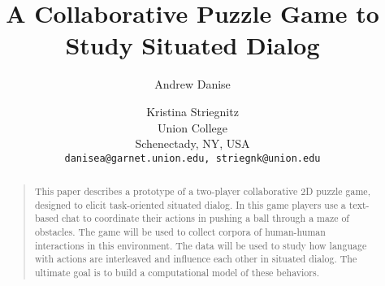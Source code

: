 \documentclass[letterpaper]{article}
\begin{document}
%
\title{A Collaborative Puzzle Game to Study Situated Dialog}
\author{
Andrew Danise \and Kristina Striegnitz\\
Union College\\
Schenectady, NY, USA\\
\texttt{danisea@garnet.union.edu, striegnk@union.edu}
}
\maketitle
\begin{abstract}
\begin{quote}
This paper describes a prototype of a two-player collaborative 2D
puzzle game, designed to elicit task-oriented situated dialog. In this
game players use a text-based chat to coordinate their actions in
pushing a ball through a maze of obstacles. The game will be used to
collect corpora of human-human interactions in this environment. The
data will be used to study how language with actions are interleaved
and influence each other in situated dialog. The ultimate goal is to
build a computational model of these behaviors.
\end{quote}
\end{abstract}













\end{document}
